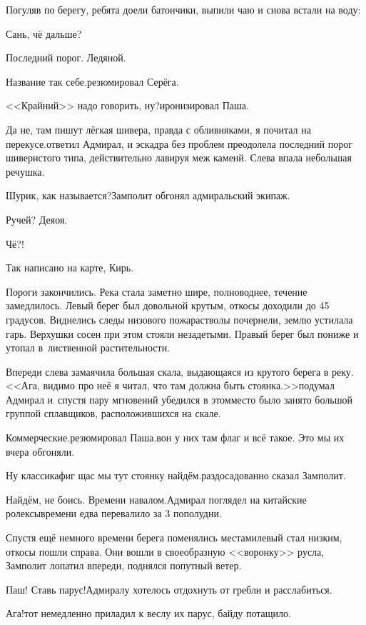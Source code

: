 Погуляв по берегу, ребята доели батончики, выпили чаю и снова встали на воду:

\diagdash Сань, чё дальше?

\diagdash Последний порог. Ледяной.

\diagdash Название так себе.\mdash резюмировал Серёга.

\diagdash <<Крайний>> надо говорить, ну?\mdash иронизировал Паша.

\diagdash Да не, там пишут лёгкая шивера, правда с обливняками, я почитал на перекусе.\mdash ответил Адмирал, и эскадра без проблем преодолела последний порог шиверистого типа, действительно лавируя меж каменй. Слева впала небольшая речушка.

\diagdash Шурик, как называется?\mdash Замполит обгонял адмиральский экипаж.

\diagdash Ручей? Деяоя.

\diagdash Чё?!

\diagdash Так написано на карте, Кирь.

Пороги закончились. Река стала заметно шире, полноводнее, течение замедлилось. Левый берег был довольной крутым, откосы доходили до 45 градусов. Виднелись следы низового пожара\mdash стволы почернели, землю устилала гарь. Верхушки сосен при этом стояли незадетыми. Правый берег был пониже и утопал в~лиственной растительности. 

Впереди слева замаячила большая скала, выдающаяся из крутого берега в реку. <<Ага, видимо про неё я читал, что там должна быть стоянка.>>\mdash подумал Адмирал и~спустя пару мгновений убедился в этом\mdash место было занято большой группой сплавщиков, расположившихся на скале.

\diagdash Коммерческие.\mdash резюмировал Паша.\mdash вон у них там флаг и всё такое. Это мы их вчера обгоняли.

\diagdash Ну классика\mdash фиг щас мы тут стоянку найдём.\mdash раздосадованно сказал Замполит.

\diagdash Найдём, не боись. Времени навалом.\mdash Адмирал поглядел на китайские ролексы\mdash времени едва перевалило за 3 пополудни.

Спустя ещё немного времени берега поменялись местами\mdash левый стал низким, откосы пошли справа. Они вошли в своеобразную <<воронку>> русла, Замполит лопатил впереди, поднялся попутный ветер.

\diagdash Паш! Ставь парус!\mdash Адмиралу хотелось отдохнуть от гребли и расслабиться.

\diagdash Ага!\mdash тот немедленно приладил к веслу их парус, байду потащило.

